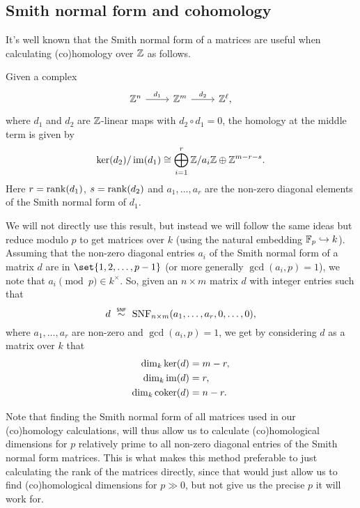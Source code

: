 \subsection{Smith normal form and cohomology}%
\label{subsec:SNF-coh}

It's well known that the Smith normal form of a matrices are useful when calculating (co)homology over $\mathbb{Z}$ as follows.

\begin{fact}\label{fact:SNF-Z-coh}
  Given a complex
  \[
    \begin{tikzcd}
      \Z^{n} \ar[r,"d_{1}"] & \Z^{m} \ar[r,"d_{2}"] & \Z^{\ell},
    \end{tikzcd}
  \]
  where $d_{1}$ and $d_{2}$ are $\mathbb{Z}$-linear maps with $d_{2} \circ d_{1} = 0$, the homology at the middle term is given by
  \begin{equation*}
    \operatorname{ker}(d_{2})/\operatorname{im}(d_{1}) \cong \bigoplus_{i=1}^{r} \mathbb{Z}/a_{i}\mathbb{Z} \oplus \mathbb{Z}^{m-r-s}.
  \end{equation*}
  Here $r = \operatorname{rank}(d_{1})$, $s = \operatorname{rank}(d_{2})$ and $a_{1},\dotsc,a_{r}$ are the non-zero diagonal elements of the Smith normal form of $d_{1}$.
\end{fact}

We will not directly use this result, but instead we will follow the same ideas but reduce modulo $p$ to get matrices over $k$ (using the natural embedding $\mathbb{F}_{p} \hookrightarrow k$). Assuming that the non-zero diagonal entries $a_{i}$ of the Smith normal form of a matrix $d$ are in $\set{1,2,\dotsc,p-1}$ (or more generally $\gcd(a_{i},p) = 1$), we note that $a_{i} \pmod{p} \in k^{\times}$. So, given an $n \times m$ matrix $d$ with integer entries such that
\begin{equation*}
  d \snfsim \SNF_{n \times m}(a_{1},\dotsc,a_{r},0,\dotsc,0),
\end{equation*}
where $a_{1},\dotsc,a_{r}$ are non-zero and $\gcd(a_{i},p) = 1$, we get by considering $d$ as a matrix over $k$ that
\begin{equation}
  \label{eq:snf-dims}
  \begin{aligned}
    \dim_{k} \operatorname{ker}(d) &= m-r, \\
    \dim_{k} \operatorname{im}(d) &= r, \\
    \dim_{k} \operatorname{coker}(d) &= n-r.
  \end{aligned}
\end{equation}

\begin{remark}
  Note that finding the Smith normal form of all matrices used in our (co)homology calculations, will thus allow us to calculate (co)homological dimensions for $p$ relatively prime to all non-zero diagonal entries of the Smith normal form matrices. This is what makes this method preferable to just calculating the rank of the matrices directly, since that would just allow us to find (co)homological dimensions for $p \gg 0$, but not give us the precise $p$ it will work for.
\end{remark}

